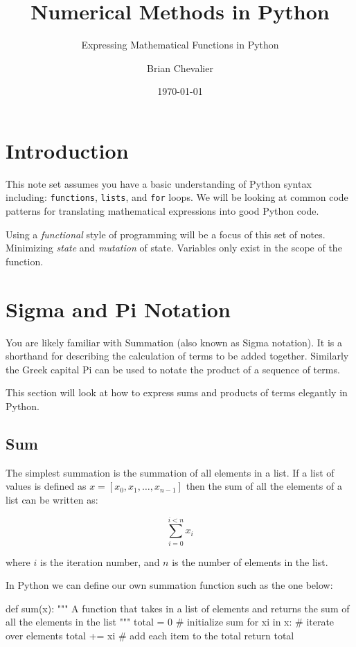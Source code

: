 \documentclass{../../KDHnotes}
\title{Numerical Methods in Python}
\subtitle{Expressing Mathematical Functions in Python}
\author{Brian Chevalier}
\date{\today}
\begin{document}
\maketitle

\section{Introduction}


This note set assumes you have a basic understanding of Python syntax including: \texttt{functions}, \texttt{lists}, and \texttt{for} loops. We will be looking at common code patterns for translating mathematical expressions into good Python code.

Using a \textit{functional} style of programming will be a focus of this set of notes.
Minimizing \textit{state} and \textit{mutation} of state. Variables only exist in the scope of the function.

\section{Sigma and Pi Notation}

You are likely familiar with Summation (also known as Sigma notation). It is a shorthand for describing the calculation of terms to be added together. Similarly the Greek capital Pi can be used to notate the product of a sequence of terms.

This section will look at how to express sums and products of terms elegantly in Python.

\subsection{Sum}

The simplest summation is the summation of all elements in a list. If a list of values is defined as $x  = [x_0, x_1, \dots, x_{n-1}]$ then the sum of all the elements of a list can be written as:

\begin{equation}
	\sum_{i=0}^{i<n} x_i
\end{equation}

where $i$ is the iteration number, and $n$ is the number of elements in the list.

In Python we can define our own summation function such as the one below:

\begin{python}
def sum(x):
    """
    A function that takes in a list of elements and returns the sum of all the elements in the list    
    """
    total = 0         # initialize sum
    for xi in x:      # iterate over elements
        total += xi # add each item to the total
    return total
\end{python}
\end{document}
